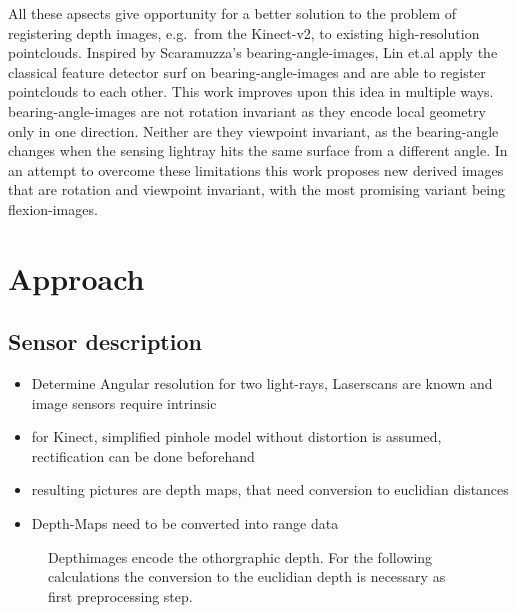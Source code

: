 \documentclass[doktyp=marbeit,fontsize=12pt,sprache=english,draft=true,hausschrift=true,fleqn]{TUBAFarbeiten}
\begin{document}
All these apsects give opportunity for a better solution to the problem
of registering depth images, e.g.~from the Kinect-v2, to existing
high-resolution pointclouds.
Inspired by Scaramuzza's \Glspl{bearing-angle-image}\cite{Scaramuzza2007}, Lin et.al\cite{Lin2017} apply the classical feature detector \gls{surf}\cite{Bay2006} on \Glspl{bearing-angle-image} and are able to register pointclouds to each other.
This work improves upon this idea in multiple ways.
\Glspl{bearing-angle-image} are not rotation invariant as they encode local geometry only in one direction.
Neither are they viewpoint invariant, as the \gls{bearing-angle} changes when the sensing lightray hits the same surface from a different angle.
In an attempt to overcome these limitations this work proposes new derived images that are rotation and viewpoint invariant, with the most promising variant being \Glspl{flexion-image}.

\section{Approach}\label{approach}

\subsection{Sensor description}

\begin{itemize}
    \item Determine Angular resolution for two light-rays, Laserscans are known and image sensors require intrinsic
    \item for Kinect, simplified pinhole model without distortion is assumed, rectification can be done beforehand
    \item resulting pictures are depth maps, that need conversion to euclidian distances
    \item Depth-Maps need to be converted into range data
\end{itemize}

\begin{figure}[H]
    
    \caption[Range Data and Depth Maps visualized]{Depthimages encode the othorgraphic depth. For the following calculations the conversion to the euclidian depth is necessary as first preprocessing step.}
\end{figure}
\end{document}

